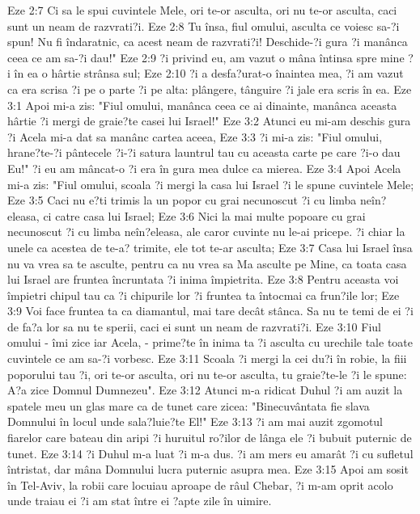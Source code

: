Eze 2:7  Ci sa le spui cuvintele Mele, ori te-or asculta, ori nu te-or asculta, caci sunt un neam de razvrati?i.
Eze 2:8  Tu însa, fiul omului, asculta ce voiesc sa-?i spun! Nu fi îndaratnic, ca acest neam de razvrati?i! Deschide-?i gura ?i manânca ceea ce am sa-?i dau!"
Eze 2:9  ?i privind eu, am vazut o mâna întinsa spre mine ?i în ea o hârtie strânsa sul;
Eze 2:10  ?i a desfa?urat-o înaintea mea, ?i am vazut ca era scrisa ?i pe o parte ?i pe alta: plângere, tânguire ?i jale era scris în ea.
Eze 3:1  Apoi mi-a zis: "Fiul omului, manânca ceea ce ai dinainte, manânca aceasta hârtie ?i mergi de graie?te casei lui Israel!"
Eze 3:2  Atunci eu mi-am deschis gura ?i Acela mi-a dat sa manânc cartea aceea,
Eze 3:3  ?i mi-a zis: "Fiul omului, hrane?te-?i pântecele ?i-?i satura launtrul tau cu aceasta carte pe care ?i-o dau Eu!" ?i eu am mâncat-o ?i era în gura mea dulce ca mierea.
Eze 3:4  Apoi Acela mi-a zis: "Fiul omului, scoala ?i mergi la casa lui Israel ?i le spune cuvintele Mele;
Eze 3:5  Caci nu e?ti trimis la un popor cu grai necunoscut ?i cu limba neîn?eleasa, ci catre casa lui Israel;
Eze 3:6  Nici la mai multe popoare cu grai necunoscut ?i cu limba neîn?eleasa, ale caror cuvinte nu le-ai pricepe. ?i chiar la unele ca acestea de te-a? trimite, ele tot te-ar asculta;
Eze 3:7  Casa lui Israel însa nu va vrea sa te asculte, pentru ca nu vrea sa Ma asculte pe Mine, ca toata casa lui Israel are fruntea încruntata ?i inima împietrita.
Eze 3:8  Pentru aceasta voi împietri chipul tau ca ?i chipurile lor ?i fruntea ta întocmai ca frun?ile lor;
Eze 3:9  Voi face fruntea ta ca diamantul, mai tare decât stânca. Sa nu te temi de ei ?i de fa?a lor sa nu te sperii, caci ei sunt un neam de razvrati?i.
Eze 3:10  Fiul omului - îmi zice iar Acela, - prime?te în inima ta ?i asculta cu urechile tale toate cuvintele ce am sa-?i vorbesc.
Eze 3:11  Scoala ?i mergi la cei du?i în robie, la fiii poporului tau ?i, ori te-or asculta, ori nu te-or asculta, tu graie?te-le ?i le spune: A?a zice Domnul Dumnezeu".
Eze 3:12  Atunci m-a ridicat Duhul ?i am auzit la spatele meu un glas mare ca de tunet care zicea: "Binecuvântata fie slava Domnului în locul unde sala?luie?te El!"
Eze 3:13  ?i am mai auzit zgomotul fiarelor care bateau din aripi ?i huruitul ro?ilor de lânga ele ?i bubuit puternic de tunet.
Eze 3:14  ?i Duhul m-a luat ?i m-a dus. ?i am mers eu amarât ?i cu sufletul întristat, dar mâna Domnului lucra puternic asupra mea.
Eze 3:15  Apoi am sosit în Tel-Aviv, la robii care locuiau aproape de râul Chebar, ?i m-am oprit acolo unde traiau ei ?i am stat între ei ?apte zile în uimire.
